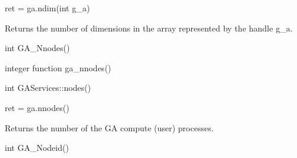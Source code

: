 \documentclass[12pt]{article}
\begin{document}
\begin{pyapi}
\begin{pycode}
ret = ga.ndim(int g_a)
\end{pycode}
\begin{funcargs}
\end{funcargs}
\end{pyapi}

\local

\begin{desc}

Returns the number of dimensions in the array represented by the handle g_a.

\end{desc}


\begin{capi}
\begin{ccode}
int GA_Nnodes()
\end{ccode}
\end{capi}

\begin{fapi}
\begin{fcode}
integer function ga_nnodes()
\end{fcode}
\end{fapi}

\begin{cxxapi}
\begin{cxxcode}
int GAServices::nodes()
\end{cxxcode}
\end{cxxapi}

\begin{pyapi}
\begin{pycode}
ret = ga.nnodes()
\end{pycode}
\end{pyapi}

\local

\begin{desc}

Returns the number of the GA compute (user) processes.

\end{desc}


\begin{capi}
\begin{ccode}
int GA_Nodeid()
\end{ccode}
\end{capi}
\end{document}

